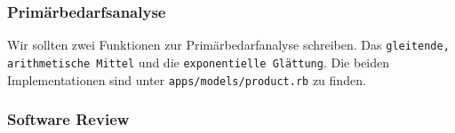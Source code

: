 \subsubsection{Prim\"arbedarfsanalyse}
Wir sollten zwei Funktionen zur Prim\"arbedarfanalyse schreiben. Das \texttt{gleitende, arithmetische Mittel} und die \texttt{exponentielle Gl\"attung}. Die beiden Implementationen sind unter \texttt{apps/models/product.rb} zu finden. 

\subsubsection{Software Review}
